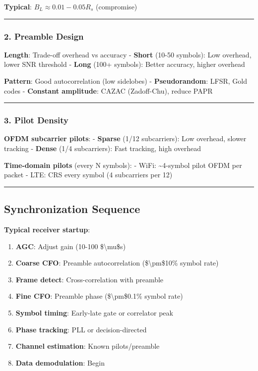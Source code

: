 \textbf{Typical}: \(B_L \approx 0.01 - 0.05 R_s\) (compromise)

\begin{center}\rule{0.5\linewidth}{0.5pt}\end{center}

\subsubsection{2. Preamble Design}\label{preamble-design}

\textbf{Length}: Trade-off overhead vs accuracy - \textbf{Short} (10-50
symbols): Low overhead, lower SNR threshold - \textbf{Long} (100+
symbols): Better accuracy, higher overhead

\textbf{Pattern}: Good autocorrelation (low sidelobes) -
\textbf{Pseudorandom}: LFSR, Gold codes - \textbf{Constant amplitude}:
CAZAC (Zadoff-Chu), reduce PAPR

\begin{center}\rule{0.5\linewidth}{0.5pt}\end{center}

\subsubsection{3. Pilot Density}\label{pilot-density}

\textbf{OFDM subcarrier pilots}: - \textbf{Sparse} (1/12 subcarriers):
Low overhead, slower tracking - \textbf{Dense} (1/4 subcarriers): Fast
tracking, high overhead

\textbf{Time-domain pilots} (every N symbols): - WiFi:
\textasciitilde4-symbol pilot OFDM per packet - LTE: CRS every symbol (4
subcarriers per 12)

\begin{center}\rule{0.5\linewidth}{0.5pt}\end{center}

\subsection{Synchronization Sequence}\label{synchronization-sequence}

\textbf{Typical receiver startup}:

\begin{enumerate}
\def\labelenumi{\arabic{enumi}.}
\tightlist
\item
  \textbf{AGC}: Adjust gain (10-100 \$\textbackslash mu\$s)
\item
  \textbf{Coarse CFO}: Preamble autocorrelation
  (\$\textbackslash pm\$10\% symbol rate)
\item
  \textbf{Frame detect}: Cross-correlation with preamble
\item
  \textbf{Fine CFO}: Preamble phase (\$\textbackslash pm\$0.1\% symbol
  rate)
\item
  \textbf{Symbol timing}: Early-late gate or correlator peak
\item
  \textbf{Phase tracking}: PLL or decision-directed
\item
  \textbf{Channel estimation}: Known pilots/preamble
\item
  \textbf{Data demodulation}: Begin
\end{enumerate}

